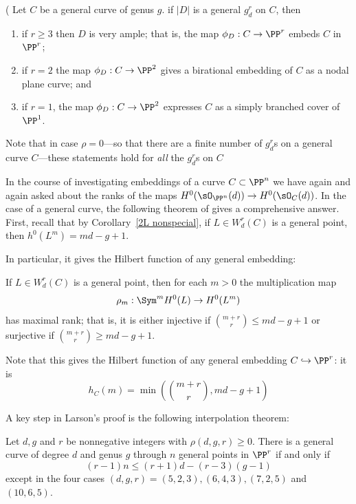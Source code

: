 \begin{theorem}\label{grd omnibus}(\cite[Proposition 5.4]{Eisenbud-Harris83}
Let $C$ be a general curve of genus $g$.
 if $|D|$ is a general $g^r_d$ on $C$, then

 \begin{enumerate}
\item if $r \geq 3$ then $D$ is very ample; that is, the map $\phi_D : C \to \PP^r$   embeds $C$ in $\PP^r$;
\item if $r=2$ the map $\phi_D : C \to \PP^2$ gives a birational embedding of $C$ as a nodal plane curve; and 
\item if $r=1$, the map $\phi_D : C \to \PP^2$ expresses $C$ as a simply branched cover of $\PP^1$.
\end{enumerate}
\end{theorem}

Note that in case $\rho = 0$---so that there are a finite number of $g^r_d$s on a general curve $C$---these statements hold for \emph{all} the $g^r_d$s on $C$

In the course of investigating embeddings of a curve $C\subset \PP^n$ we have again and again
asked about the ranks of the maps $H^0(\sO_{\PP^n}(d)) \to H^0(\sO_C(d))$. In the case of
a general curve, the following theorem of \cite{ELarson2018} gives a comprehensive answer. First, recall that by Corollary~\ref{2L nonspecial}, if $L \in W^r_d(C)$ is a general point, then $h^0(L^m) = md-g+1$.

In particular, it gives
 the Hilbert function of any general embedding:
 
\begin{theorem}[Larson]\label{maximal rank}
If $L \in W^r_d(C)$ is a general point, then for each $m > 0$ the multiplication map
$$
\rho_m : \Sym^m H^0(L) \to H^0(L^m)
$$
has maximal rank; that is, it is either injective if $\binom{m+r}{r} \leq md-g+1$ or surjective if $\binom{m+r}{r} \geq md-g+1$.
\end{theorem}


Note that this gives
 the Hilbert function of any general embedding $C \hookrightarrow \PP^r$: it is 
 $$
 h_C(m) = \min(\binom{m+r}{r} , md-g+1)
 $$
 


A key step in Larson's proof is the following interpolation theorem:

\begin{theorem}\label{Larson-Vogt}
Let $d, g$ and $r$
be nonnegative integers with $\rho(d, g, r) \geq 0$. There is a general curve of degree $d$ and genus $g$ through $n$ general
points in $\PP^r$
if and only if
$$
(r-1)n \leq (r + 1)d-(r-3)(g-1)
$$
except in the four cases $(d, g, r) = (5, 2, 3),(6, 4, 3),(7, 2, 5)$ and $(10, 6, 5)$.

 \end{theorem}
 
